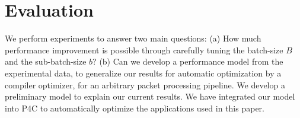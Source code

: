 \section{Evaluation}
\label{evaluation}
We perform experiments to answer two main questions: (a) How much performance improvement is possible through carefully tuning the batch-size $B$ and
the sub-batch-size $b$?  (b) Can we develop a performance model from the experimental data, to generalize our results for automatic
optimization by a compiler
optimizer, for an arbitrary packet processing pipeline. We develop a preliminary model to explain our current results. We have
integrated our model into P4C
to automatically optimize the applications used in this paper.


